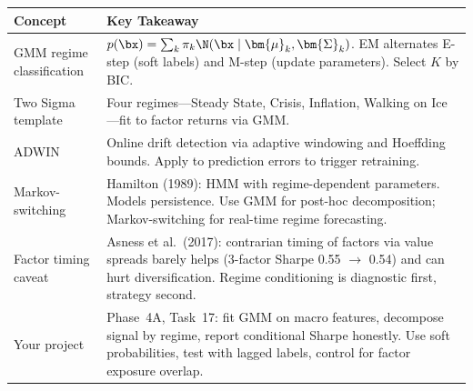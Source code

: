 \begin{center}
\begin{tabular}{p{4cm} p{9.5cm}}
  \toprule
  \textbf{Concept} & \textbf{Key Takeaway} \\
  \midrule
  GMM regime classification &
    $p(\bx) = \sum_k \pi_k \N(\bx \mid \bm{\mu}_k, \bm{\Sigma}_k)$.
    EM alternates E-step (soft labels) and M-step (update parameters).
    Select $K$ by BIC. \\[4pt]
  Two Sigma template &
    Four regimes---Steady State, Crisis, Inflation, Walking on Ice---fit
    to factor returns via GMM. \\[4pt]
  ADWIN &
    Online drift detection via adaptive windowing and Hoeffding bounds.
    Apply to prediction errors to trigger retraining. \\[4pt]
  Markov-switching &
    Hamilton (1989): HMM with regime-dependent parameters.  Models
    persistence.  Use GMM for post-hoc decomposition; Markov-switching
    for real-time regime forecasting. \\[4pt]
  Factor timing caveat &
    Asness et al.\ (2017): contrarian timing of factors via value spreads
    barely helps (3-factor Sharpe 0.55 $\to$ 0.54) and can hurt
    diversification.  Regime conditioning is diagnostic first, strategy
    second. \\[4pt]
  Your project &
    Phase~4A, Task~17: fit GMM on macro features, decompose signal by
    regime, report conditional Sharpe honestly.  Use soft probabilities,
    test with lagged labels, control for factor exposure overlap. \\
  \bottomrule
\end{tabular}
\end{center}
